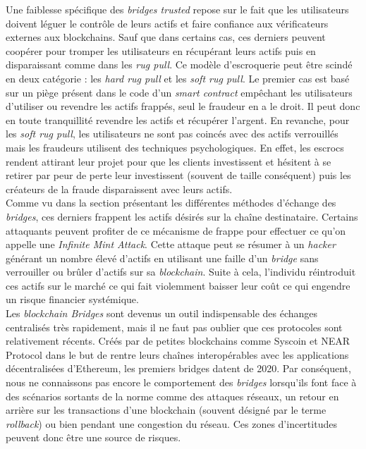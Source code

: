 Une faiblesse spécifique des \textit{bridges trusted} repose sur le fait que les utilisateurs doivent léguer le contrôle de leurs \gls{actif}s et faire confiance aux vérificateurs externes aux \gls{blockchain}s. Sauf que dans certains cas, ces derniers peuvent coopérer pour tromper les utilisateurs en récupérant leurs \gls{actif}s puis en disparaissant comme dans les \textit{rug pull}\cite{EthereumRisks}. Ce modèle d’escroquerie peut être scindé en deux catégorie : les \textit{hard rug pull} et les \textit{soft rug pull}\cite{Hacken}. Le premier cas est basé sur un piège présent dans le code d’un \textit{\gls{smart contract}} empêchant les utilisateurs d’utiliser ou revendre les \gls{actif}s frappés, seul le fraudeur en a le droit. Il peut donc en toute tranquillité revendre les \gls{actif}s et récupérer l’argent. En revanche, pour les \textit{soft rug pull}, les utilisateurs ne sont pas coincés avec des \gls{actif}s verrouillés mais les fraudeurs utilisent des techniques psychologiques. En effet, les escrocs rendent attirant leur projet pour que les clients investissent et hésitent à se retirer par peur de perte leur investissent (souvent de taille conséquent) puis les créateurs de la fraude disparaissent avec leurs \gls{actif}s.\\

Comme vu dans la section présentant les différentes méthodes d’échange des \textit{bridges}, ces derniers frappent les \gls{actif}s désirés sur la chaîne destinataire. Certains attaquants peuvent profiter de ce mécanisme de frappe pour effectuer ce qu’on appelle une \textit{Infinite Mint Attack}.\cite{ChainLinkRisks} Cette attaque peut se résumer à un \textit{hacker} générant un nombre élevé d’\gls{actif}s en utilisant une faille d’un \textit{bridge} sans verrouiller ou brûler d’\gls{actif}s sur sa \textit{\gls{blockchain}}. Suite à cela, l’individu réintroduit ces \gls{actif}s sur le marché ce qui fait violemment baisser leur coût ce qui engendre un risque financier systémique.\\

Les \textit{\gls{blockchain} Bridges} sont devenus un outil indispensable des échanges centralisés très rapidement, mais il ne faut pas oublier que ces protocoles sont relativement récents. Créés par de petites \gls{blockchain}s comme Syscoin et NEAR Protocol dans le but de rentre leurs chaînes interopérables avec les applications décentralisées d’Ethereum, les premiers bridges datent de 2020\cite{Bitstamp}. Par conséquent, nous ne connaissons pas encore le comportement des \textit{bridges} lorsqu’ils font face à des scénarios sortants de la norme comme des attaques réseaux, un retour en arrière sur les transactions d’une \gls{blockchain} (souvent désigné par le terme \textit{rollback}) ou bien pendant une congestion du réseau. Ces zones d’incertitudes peuvent donc être une source de risques. \\

